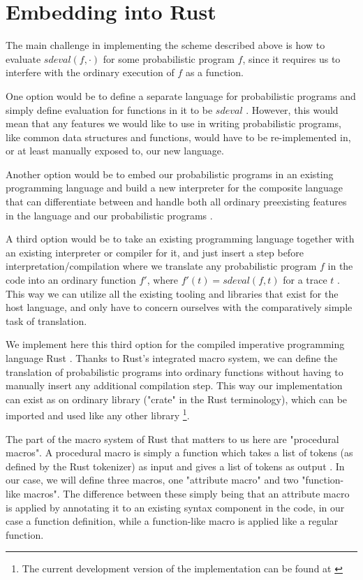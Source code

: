 \section{Embedding into Rust}

The main challenge in implementing the scheme described above is how to evaluate $sdeval(f, \cdot)$ for some probabilistic program $f$, since it requires us to interfere with the ordinary execution of $f$ as a function.

One option would be to define a separate language for probabilistic programs and simply define evaluation for functions in it to be $sdeval$ \cite{carpenter2017stan}. However, this would mean that any features we would like to use in writing probabilistic programs, like common data structures and functions, would have to be re-implemented in, or at least manually exposed to, our new language.

Another option would be to embed our probabilistic programs in an existing programming language and build a new interpreter for the composite language that can differentiate between and handle both all ordinary preexisting features in the language and our probabilistic programs \cite{goodman2012church}.

A third option would be to take an existing programming language together with an existing interpreter or compiler for it, and just insert a step before interpretation/compilation where we translate any probabilistic program $f$ in the code into an ordinary function $f'$, where $f'(t) = sdeval(f,t)$ for a trace $t$ \cite{wingate2011lightweight} \cite{cusumano2019gen}. This way we can utilize all the existing tooling and libraries that exist for the host language, and only have to concern ourselves with the comparatively simple task of translation.

We implement here this third option for the compiled imperative programming language Rust \cite{RustProg37:online}. Thanks to Rust's integrated macro system, we can define the translation of probabilistic programs into ordinary functions without having to manually insert any additional compilation step. This way our implementation can exist as on ordinary library ("crate" in the Rust terminology), which can be imported and used like any other library \footnote{The current development version of the implementation can be found at \cite{GitHubGa46:online}}.

The part of the macro system of Rust that matters to us here are "procedural macros". A procedural macro is simply a function which takes a list of tokens (as defined by the Rust tokenizer) as input and gives a list of tokens as output \cite{Procedur10:online}. In our case, we will define three macros, one "attribute macro" and two "function-like macros". The difference between these simply being that an attribute macro is applied by annotating it to an existing syntax component in the code, in our case a function definition, while a function-like macro is applied like a regular function.

